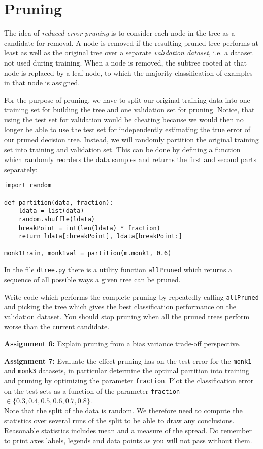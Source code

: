 \documentclass[11pt]{article}
\begin{document}
\section{Pruning}
The idea of \emph{reduced error pruning} is to consider each node in
the tree as a candidate for removal.  A node is removed if the
resulting pruned tree performs at least as well as the original tree
over a separate \emph{validation dataset}, i.e. a dataset not used
during training.  When a node is removed, the subtree rooted at that
node is replaced by a leaf node, to which the majority classification
of examples in that node is assigned.

For the purpose of pruning, we have to split our original training
data into one training set for building the tree and one validation
set for pruning.  Notice, that using the test set for validation would
be cheating because we would then no longer be able to use the test
set for independently estimating the true error of our pruned decision
tree.  Instead, we will randomly partition the original training set into
training and validation set.  This can be done by defining a function
which randomly reorders the data samples and returns the first and second
parts separately:
\begin{verbatim}
import random

def partition(data, fraction):
    ldata = list(data)
    random.shuffle(ldata)
    breakPoint = int(len(ldata) * fraction)
    return ldata[:breakPoint], ldata[breakPoint:]

monk1train, monk1val = partition(m.monk1, 0.6)
\end{verbatim}

In the file \verb!dtree.py! there is a utility function \texttt{allPruned}
which returns a sequence of all possible ways a given tree can be pruned.

Write code which performs the complete pruning by repeatedly calling
\texttt{allPruned} and picking the tree which gives the best
classification performance on the validation dataset.  You should stop
pruning when all the pruned trees perform worse than the current
candidate.

\begin{tcolorbox}
\textbf{Assignment 6:}
Explain pruning from a bias variance trade-off perspective.
\end{tcolorbox}

\begin{tcolorbox}
\textbf{Assignment 7:} Evaluate the effect pruning has on the test
error for the \texttt{monk1} and \texttt{monk3} datasets, in
particular determine the optimal partition into training and pruning
by optimizing the parameter \texttt{fraction}.  Plot the
classification error on the test sets as a function of the parameter
\texttt{fraction} $\in \{0.3,0.4,0.5,0.6,0.7,0.8\}$. \\

Note that the split of the data is random. We therefore need to compute 
the statistics over several runs of the split to be able to draw any 
conclusions. Reasonable statistics includes mean and a measure of the spread.
Do remember to print axes labels, legends and data points as you will not pass without them.
\end{tcolorbox}
\end{document}
